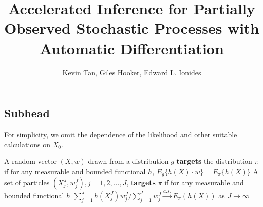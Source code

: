 \documentclass[9pt,twoside,lineno]{pnas-new}
\begin{document}
\title{Accelerated Inference for Partially Observed Stochastic Processes with Automatic Differentiation}
\author{Kevin Tan, Giles Hooker, Edward L. Ionides}


\maketitle




\SItext


\subsection*{Subhead}

For simplicity, we omit the dependence of the likelihood and other suitable calculations on $X_0$.


\begin{defn}[Targeting]
    \label{defn:targeting}
    A random vector $(X, w)$ drawn from a distribution $g$ \textbf{targets} the distribution $\pi$ if for any measurable and bounded functional $h$, $E_g\{h(X) \cdot w\}=E_\pi\{h(X)\}$ 
    A set of particles $(X^J_j, w^J_j), j=1,2, \ldots,J$, \textbf{targets} $\pi$ if for any measurable and bounded functional $h$
    ${\sum_{j=1}^J h(X^J_j) w^J_j}/{\sum_{j=1}^J w^J_j} \stackrel{a.s.}{\to} E_\pi(h(X))$ as $J\to\infty$
\end{defn}
\end{document}
